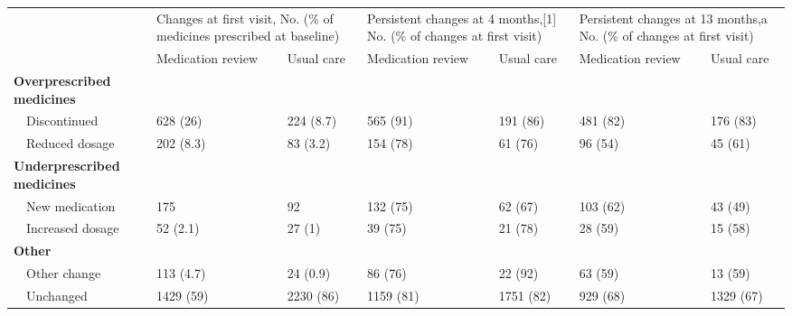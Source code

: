 \begin{table}[]
\begin{tabular}{lllllll}
\hline
\multirow{2}{*}{} &
  \multicolumn{2}{l}{Changes at first visit, No. (\% of medicines prescribed at baseline)} &
  \multicolumn{2}{l}{Persistent changes at 4   months,[1] No. (\% of changes at first visit)} &
  \multicolumn{2}{l}{Persistent changes at 13   months,a No. (\% of   changes at first visit)} \\ \cline{2-7} 
                                   & Medication review & Usual care & Medication review & Usual care & Medication review & Usual care \\ \cline{1-1}
\textbf{Overprescribed medicines}  &                   &            &                   &            &                   &            \\
~~Discontinued                     & 628 (26)          & 224 (8.7)  & 565 (91)          & 191 (86)   & 481 (82)          & 176 (83)   \\
~~Reduced dosage                   & 202 (8.3)         & 83 (3.2)   & 154 (78)          & 61 (76)    & 96 (54)           & 45 (61)    \\
\textbf{Underprescribed medicines} &                   &            &                   &            &                   &            \\
~~New medication                   & 175               & 92         & 132 (75)          & 62 (67)    & 103 (62)          & 43 (49)    \\
~~Increased dosage                 & 52 (2.1)          & 27 (1)     & 39 (75)           & 21 (78)    & 28 (59)           & 15 (58)    \\
\textbf{Other}                     &                   &            &                   &            &                   &            \\
~~Other change                     & 113 (4.7)         & 24 (0.9)   & 86 (76)           & 22 (92)    & 63 (59)           & 13 (59)    \\
~~Unchanged                        & 1429 (59)         & 2230 (86)  & 1159 (81)         & 1751 (82)  & 929 (68)          & 1329 (67) 
\end{tabular}
\end{table}